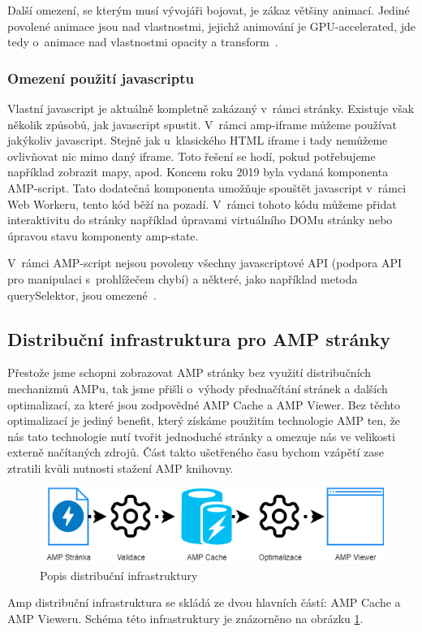 Další omezení, se kterým musí vývojáři bojovat, je zákaz většiny animací. Jediné povolené animace jsou nad vlastnostmi, jejichž animování je GPU-accelerated, jde tedy o~animace nad vlastnostmi opacity a transform~\cite{AMPCss}.

\subsubsection*{Omezení použití javascriptu}
Vlastní javascript je aktuálně kompletně zakázaný v~rámci stránky. Existuje však několik způsobů, jak javascript spustit.
V~rámci amp-iframe můžeme používat jakýkoliv javascript. Stejně jak u~klasického HTML iframe i tady nemůžeme ovlivňovat nic mimo daný iframe. Toto řešení se hodí, pokud potřebujeme například zobrazit mapy, apod.
Koncem roku 2019 byla vydaná komponenta AMP-script. Tato dodatečná komponenta umožňuje spouštět javascript v~rámci Web Workeru, tento kód běží na pozadí. V~rámci tohoto kódu můžeme přidat interaktivitu do stránky například úpravami virtuálního DOMu stránky nebo úpravou stavu komponenty amp-state.

V~rámci AMP-script nejsou povoleny všechny javascriptové API (podpora API pro manipulaci s~prohlížečem chybí) a některé, jako například metoda querySelektor, jsou omezené~\cite{amp-script}.

\subsection*{Distribuční infrastruktura pro AMP stránky}
\label{AmpInfra}
Přestože jsme schopni zobrazovat AMP stránky bez využití distribučních mechanizmů AMPu, tak jsme přišli o~výhody přednačítání stránek a dalších optimalizací, za které jsou zodpovědné AMP Cache a AMP Viewer.
Bez těchto optimalizací je jediný benefit, který získáme použitím technologie AMP ten, že nás tato technologie nutí tvořit jednoduché stránky a omezuje nás ve velikosti externě načítaných zdrojů. Část takto ušetřeného času bychom vzápětí zase ztratili kvůli nutnosti stažení AMP knihovny.

\begin{figure}[hbt]
	\centering
	\includegraphics[width=1\textwidth]{obrazky-figures/AmpDistribuce.png}
	\caption{Popis distribuční infrastruktury}
	\label{Popis Distribuční infrastruktury AMP}
\end{figure}
Amp distribuční infrastruktura se skládá ze dvou hlavních částí: AMP Cache a AMP Vieweru. Schéma této infrastruktury je znázorněno na obrázku \ref{Popis Distribuční infrastruktury AMP}.

